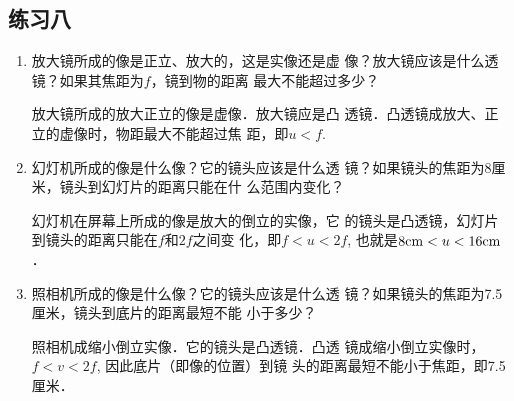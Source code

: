 \subsection{练习八}
\begin{enumerate}
    \item 放大镜所成的像是正立、放大的，这是实像还是虚
像？放大镜应该是什么透镜？如果其焦距为$f$，镜到物的距离
最大不能超过多少？

\begin{solution}
放大镜所成的放大正立的像是虚像．放大镜应是凸
    透镜．凸透镜成放大、正立的虚像时，物距最大不能超过焦
    距，即$u<f$.
\end{solution}
\item 幻灯机所成的像是什么像？它的镜头应该是什么透
镜？如果镜头的焦距为8厘米，镜头到幻灯片的距离只能在什
么范围内变化？

\begin{solution}
    幻灯机在屏幕上所成的像是放大的倒立的实像，它
    的镜头是凸透镜，幻灯片到镜头的距离只能在$f$和$2f$之间变
    化，即$f<u<2f$, 也就是$8{\rm cm}<u<16{\rm cm}$．
\end{solution}
\item 照相机所成的像是什么像？它的镜头应该是什么透
镜？如果镜头的焦距为7.5厘米，镜头到底片的距离最短不能
小于多少？

\begin{solution}
照相机成缩小倒立实像．它的镜头是凸透镜．凸透
镜成缩小倒立实像时，$f<v<2f$, 因此底片（即像的位置）到镜
头的距离最短不能小于焦距，即7.5厘米．
\end{solution}
\end{enumerate}







